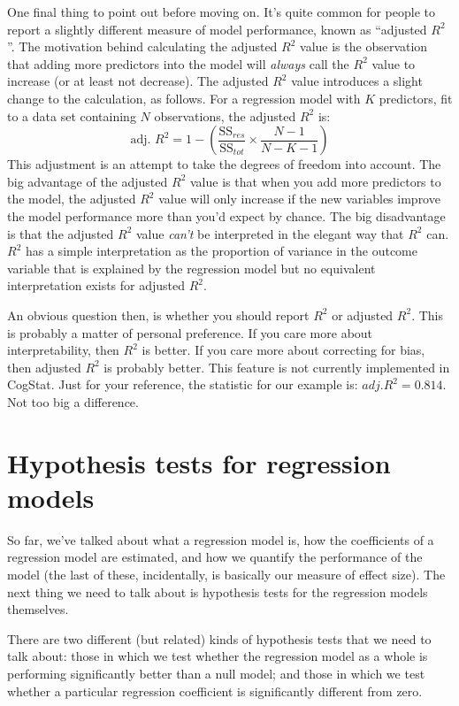 \documentclass[
]{book}
\theoremstyle{definition}
\theoremstyle{definition}
\theoremstyle{definition}
\theoremstyle{definition}
\theoremstyle{remark}
\begin{document}
One final thing to point out before moving on. It's quite common for people to report a slightly different measure of model performance, known as ``adjusted \(R^2\)''. The motivation behind calculating the adjusted \(R^2\) value is the observation that adding more predictors into the model will \emph{always} call the \(R^2\) value to increase (or at least not decrease). The adjusted \(R^2\) value introduces a slight change to the calculation, as follows. For a regression model with \(K\) predictors, fit to a data set containing \(N\) observations, the adjusted \(R^2\) is:
\[
\mbox{adj. } R^2 = 1 - \left(\frac{\mbox{SS}_{res}}{\mbox{SS}_{tot}} \times \frac{N-1}{N-K-1} \right)
\]
This adjustment is an attempt to take the degrees of freedom into account. The big advantage of the adjusted \(R^2\) value is that when you add more predictors to the model, the adjusted \(R^2\) value will only increase if the new variables improve the model performance more than you'd expect by chance. The big disadvantage is that the adjusted \(R^2\) value \emph{can't} be interpreted in the elegant way that \(R^2\) can. \(R^2\) has a simple interpretation as the proportion of variance in the outcome variable that is explained by the regression model but no equivalent interpretation exists for adjusted \(R^2\).

An obvious question then, is whether you should report \(R^2\) or adjusted \(R^2\). This is probably a matter of personal preference. If you care more about interpretability, then \(R^2\) is better. If you care more about correcting for bias, then adjusted \(R^2\) is probably better. This feature is not currently implemented in CogStat. Just for your reference, the statistic for our example is: \(adj. R^2 = 0.814\). Not too big a difference.

\hypertarget{regressiontests}{%
\section{Hypothesis tests for regression models}\label{regressiontests}}

So far, we've talked about what a regression model is, how the coefficients of a regression model are estimated, and how we quantify the performance of the model (the last of these, incidentally, is basically our measure of effect size). The next thing we need to talk about is hypothesis tests for the regression models themselves.

There are two different (but related) kinds of hypothesis tests that we need to talk about: those in which we test whether the regression model as a whole is performing significantly better than a null model; and those in which we test whether a particular regression coefficient is significantly different from zero.
\end{document}
